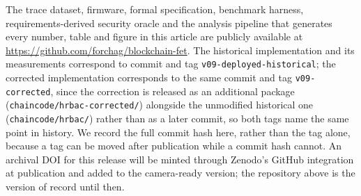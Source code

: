 \documentclass[a4paper,fleqn]{cas-sc}
\begin{document}
The trace dataset, firmware, formal specification, benchmark harness,
requirements-derived security oracle and the analysis pipeline that
generates every number, table and figure in this article are publicly
available at \url{https://github.com/forchag/blockchain-fet}. The
historical implementation and its measurements correspond to commit
\texttt{\CommitHash} and tag \texttt{v09-deployed-historical}; the
corrected implementation corresponds to the same commit and tag
\texttt{v09-corrected}, since the correction is released as an additional
package (\texttt{chaincode/hrbac-corrected/}) alongside the unmodified
historical one (\texttt{chaincode/hrbac/}) rather than as a later commit,
so both tags name the same point in history. We record the full commit
hash here, rather than the tag alone, because a tag can be moved after
publication while a commit hash cannot. An archival DOI for this release
will be minted through Zenodo's GitHub integration at publication and
added to the camera-ready version; the repository above is the version of
record until then.

\clearpage


\end{document}
